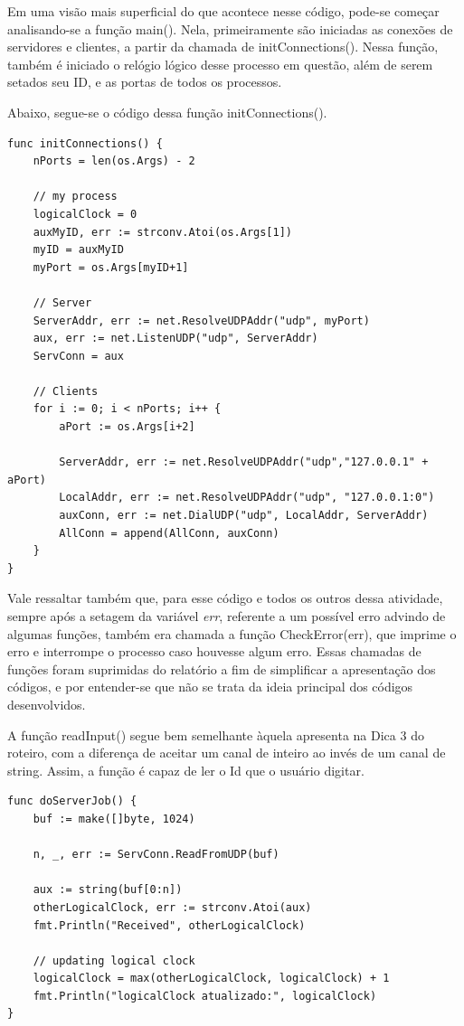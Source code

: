 \documentclass[conference]{IEEEtran}
\begin{document}
	Em uma visão mais superficial do que acontece nesse código, pode-se começar analisando-se a função main(). Nela, primeiramente são iniciadas as conexões de servidores e clientes, a partir da chamada de initConnections(). Nessa função, também é iniciado o relógio lógico desse processo em questão, além de serem setados seu ID, e as portas de todos os processos. 
	
	Abaixo, segue-se o código dessa função initConnections().
	
\begin{lstlisting}
func initConnections() {
	nPorts = len(os.Args) - 2

	// my process
	logicalClock = 0
	auxMyID, err := strconv.Atoi(os.Args[1])
	myID = auxMyID
	myPort = os.Args[myID+1]

	// Server
	ServerAddr, err := net.ResolveUDPAddr("udp", myPort)
	aux, err := net.ListenUDP("udp", ServerAddr)
	ServConn = aux

	// Clients
	for i := 0; i < nPorts; i++ {
		aPort := os.Args[i+2]
		
		ServerAddr, err := net.ResolveUDPAddr("udp","127.0.0.1" + aPort)
		LocalAddr, err := net.ResolveUDPAddr("udp", "127.0.0.1:0")
		auxConn, err := net.DialUDP("udp", LocalAddr, ServerAddr)
		AllConn = append(AllConn, auxConn)
	}
}
\end{lstlisting}

	Vale ressaltar também que, para esse código e todos os outros dessa atividade, sempre após a setagem da variável \textit{err}, referente a um possível erro advindo de algumas funções, também era chamada a função CheckError(err), que imprime o erro e interrompe o processo caso houvesse algum erro. Essas chamadas de funções foram suprimidas do relatório a fim de simplificar a apresentação dos códigos, e por entender-se que não se trata da ideia principal dos códigos desenvolvidos.
	
	A função readInput() segue bem semelhante àquela apresenta na Dica 3 do roteiro, com a diferença de aceitar um canal de inteiro ao invés de um canal de string. Assim, a função é capaz de ler o Id que o usuário digitar.

\begin{lstlisting}
func doServerJob() {
	buf := make([]byte, 1024)

	n, _, err := ServConn.ReadFromUDP(buf)

	aux := string(buf[0:n])
	otherLogicalClock, err := strconv.Atoi(aux)
	fmt.Println("Received", otherLogicalClock)
	
	// updating logical clock
	logicalClock = max(otherLogicalClock, logicalClock) + 1
	fmt.Println("logicalClock atualizado:", logicalClock)
}
\end{lstlisting}
\end{document}
